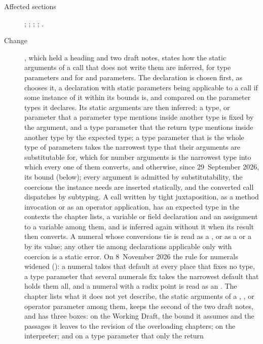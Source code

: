 \begin{description}
\item[Affected sections] ; ;
; ; .
\item[Change] , which held a heading and two draft
notes, states how the static arguments of a call that does not write them are
inferred, for type parameters and for  and  parameters.
The declaration is chosen first, as  chooses it, a
declaration with static parameters being applicable to a call if some instance
of it within its bounds is, and compared on the parameter types it declares.
Its static arguments are then inferred: a type,  or 
parameter that a parameter type mentions inside another type is fixed by the
argument, and a type parameter that the return type mentions inside another
type by the expected type; a type parameter that
is the whole type of parameters takes the narrowest type that their arguments
are substitutable for, which for number arguments is the narrowest type into
which every one of them converts, and otherwise, since 29~September 2026, its
bound (below); every
argument is admitted by substitutability, the coercions the instance needs are
inserted statically, and the converted call dispatches by subtyping.
A call written by tight juxtaposition, as a method invocation or as an operator
application, has an expected type in the contexts the chapter lists, a variable
or field declaration and an assignment to a variable among them, and is
inferred again without it when its result then converts.
A numeral whose conversions tie is read as a , or as a
 or a  by its value; any other tie among
declarations applicable only with coercion is a static error.
On 8~November 2026 the rule for numerals widened ():
a numeral takes that default at every place that fixes no type, a type
parameter that several numerals fix takes the narrowest default that holds them
all, and a numeral with a radix point is read as an .
The chapter lists what it does not yet describe, the static arguments of a
, ,  or operator parameter among them, keeps the
second of the two draft notes, and has three boxes: on the Working Draft, the
bound it assumes and the passages it leaves to the revision of the overloading
chapters; on the interpreter; and on a type parameter that only the return

\end{description}
